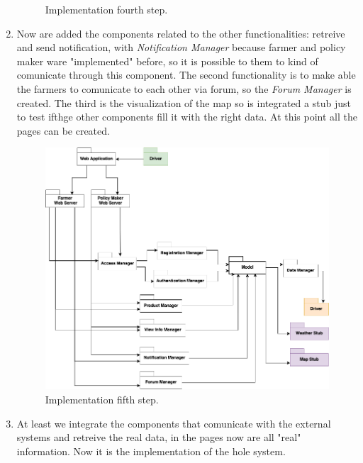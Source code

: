 \begin{enumerate}
\begin{figure}[H]
\begin{center}
        \caption{Implementation fourth step.}
        \label{fig:fourth step}
        \end{center}
    \end{figure}
    \item Now are added the components related to the other functionalities: retreive and send notification, with \textsl{Notification Manager} because farmer and policy maker ware "implemented" before, so it is possible to them to kind of comunicate through this component. The second functionality is to make able the farmers to comunicate to each other via forum, so the \textsl{Forum Manager} is created. The third is the visualization of the map so is integrated a stub just to test ifthge other components fill it with the right data. At this point all the pages can be created.
    \begin{figure}[H]
        \begin{center}
        \includegraphics[width=1\textwidth]{implementation/step5.png}
        \caption{Implementation fifth step.}
        \label{fig:fifth step}
        \end{center}
    \end{figure}
    \item At least we integrate the components that comunicate with the external systems and retreive the real data, in the pages now are all "real" information. Now it is the implementation of the hole system.
    \begin{figure}[H]
        \begin{center}

\end{center}
\end{figure}
\end{enumerate}
